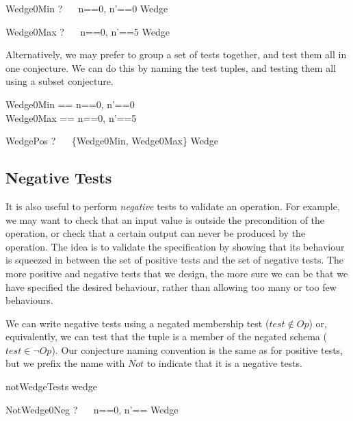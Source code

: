 \documentclass{llncs}
\begin{document}
\begin{theorem}{Wedge0Min}
\vdash? ~~ \lblot n==0, n'==0 \rblot \in Wedge
\end{theorem}

\begin{theorem}{Wedge0Max}
\vdash? ~~ \lblot n==0, n'==5 \rblot \in Wedge
\end{theorem}

Alternatively, we may prefer to group a set of tests together, and test
them all in one conjecture.  We can do this by naming the test tuples, and
testing them all using a subset conjecture.

\begin{zed}
  Wedge0Min == \lblot n==0, n'==0 \rblot \\
  Wedge0Max == \lblot n==0, n'==5 \rblot
\end{zed}

\begin{theorem}{WedgePos}
  \vdash? ~~ \{Wedge0Min, Wedge0Max\} \subseteq Wedge
\end{theorem}


\subsection{Negative Tests}

It is also useful to perform \emph{negative} tests to validate an
operation.  For example, we may want to check that an input value is
outside the precondition of the operation, or check that a certain output
can never be produced by the operation.  The idea is to validate the
specification by showing that its behaviour is squeezed in between the set
of positive tests and the set of negative tests.  The more positive and
negative tests that we design, the more sure we can be that we have
specified the desired behaviour, rather than allowing too many or too few
behaviours.

We can write negative tests using a negated membership test ($test \notin
Op$) or, equivalently, we can test that the tuple is a member of the negated
schema ($test \in \lnot Op$).
Our conjecture naming convention is the same as for positive tests, but
we prefix the name with $Not$ to indicate that it is a negative tests.

\begin{zsection}
  \SECTION notWedgeTests \parents wedge
\end{zsection}

\begin{theorem}{NotWedge0Neg}
\vdash? ~~ \lblot n==0, n'== \rblot \notin Wedge
\end{theorem}
\end{document}
